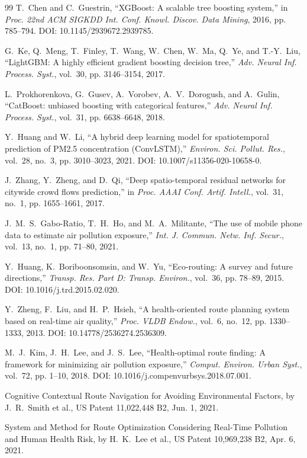 \documentclass[journal]{IEEEtran}
\begin{document}
\begin{thebibliography}{99}
T.~Chen and C.~Guestrin, ``XGBoost: A scalable tree boosting system,'' in \emph{Proc. 22nd ACM SIGKDD Int. Conf. Knowl. Discov. Data Mining}, 2016, pp. 785--794. DOI: 10.1145/2939672.2939785.

G.~Ke, Q.~Meng, T.~Finley, T.~Wang, W.~Chen, W.~Ma, Q.~Ye, and T.-Y.~Liu, ``LightGBM: A highly efficient gradient boosting decision tree,'' \emph{Adv. Neural Inf. Process. Syst.}, vol.~30, pp. 3146--3154, 2017.

L.~Prokhorenkova, G.~Gusev, A.~Vorobev, A.~V.~Dorogush, and A.~Gulin, ``CatBoost: unbiased boosting with categorical features,'' \emph{Adv. Neural Inf. Process. Syst.}, vol.~31, pp. 6638--6648, 2018.

Y.~Huang and W.~Li, ``A hybrid deep learning model for spatiotemporal prediction of PM2.5 concentration (ConvLSTM),'' \emph{Environ. Sci. Pollut. Res.}, vol.~28, no.~3, pp. 3010--3023, 2021. DOI: 10.1007/s11356-020-10658-0.

J.~Zhang, Y.~Zheng, and D.~Qi, ``Deep spatio-temporal residual networks for citywide crowd flows prediction,'' in \emph{Proc. AAAI Conf. Artif. Intell.}, vol.~31, no.~1, pp. 1655--1661, 2017.

J.~M.~S.~Gabo-Ratio, T.~H.~Ho, and M.~A.~Militante, ``The use of mobile phone data to estimate air pollution exposure,'' \emph{Int. J. Commun. Netw. Inf. Secur.}, vol.~13, no.~1, pp. 71--80, 2021.

Y.~Huang, K.~Boriboonsomsin, and W.~Yu, ``Eco-routing: A survey and future directions,'' \emph{Transp. Res. Part D: Transp. Environ.}, vol.~36, pp. 78--89, 2015. DOI: 10.1016/j.trd.2015.02.020.

Y.~Zheng, F.~Liu, and H.~P.~Hsieh, ``A health-oriented route planning system based on real-time air quality,'' \emph{Proc. VLDB Endow.}, vol.~6, no.~12, pp. 1330--1333, 2013. DOI: 10.14778/2536274.2536309.

M.~J.~Kim, J.~H.~Lee, and J.~S.~Lee, ``Health-optimal route finding: A framework for minimizing air pollution exposure,'' \emph{Comput. Environ. Urban Syst.}, vol.~72, pp. 1--10, 2018. DOI: 10.1016/j.compenvurbsys.2018.07.001.

Cognitive Contextual Route Navigation for Avoiding Environmental Factors, by J.~R.~Smith et al., US Patent 11,022,448 B2, Jun. 1, 2021.

System and Method for Route Optimization Considering Real-Time Pollution and Human Health Risk, by H.~K.~Lee et al., US Patent 10,969,238 B2, Apr. 6, 2021.


\end{thebibliography}
\end{document}
